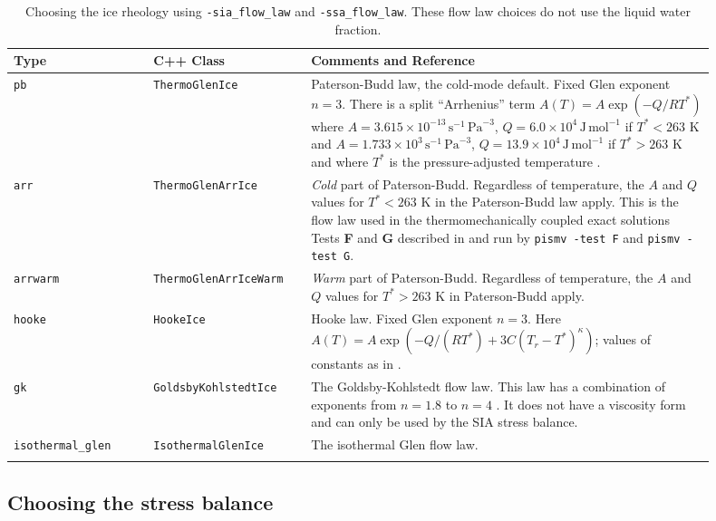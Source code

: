 \begin{table}[ht]
\centering
{}
\small
\begin{tabular}{p{0.18\linewidth}p{0.2\linewidth}p{0.52\linewidth}}\toprule
\textbf{Type} & C++ Class & \textbf{Comments and Reference} \\ \midrule
\texttt{pb} &\texttt{ThermoGlenIce}  & Paterson-Budd law, the cold-mode default.  Fixed Glen exponent $n=3$.  There is a split ``Arrhenius'' term $A(T) = A \exp(-Q/RT^*)$ where \mbox{$A = 3.615 \times 10^{-13}\, \text{s}^{-1}\, \text{Pa}^{-3}$}, \mbox{$Q = 6.0 \times 10^4\, \text{J}\, \text{mol}^{-1}$} if $T^* < 263$ K and
 \mbox{$A = 1.733 \times 10^{3}\, \text{s}^{-1}\, \text{Pa}^{-3}$}, \mbox{$Q = 13.9 \times 10^4\, \text{J}\, \text{mol}^{-1}$} if $T^* > 263$ K and where $T^*$ is the pressure-adjusted temperature \cite{PatersonBudd}. \\
\texttt{arr} &  \texttt{ThermoGlenArrIce} & \emph{Cold} part of Paterson-Budd.  Regardless of temperature, the $A$ and $Q$ values for $T^*<263$ K in  the Paterson-Budd law apply.  This is the flow law used in the thermomechanically coupled exact solutions Tests \textbf{F} and \textbf{G} described in \cite{BBL,BB} and run by \texttt{pismv -test F} and \texttt{pismv -test G}. \\
\texttt{arrwarm} & \texttt{ThermoGlenArrIceWarm} & \emph{Warm} part of Paterson-Budd.  Regardless of temperature, the $A$ and $Q$ values for $T^*>263$ K in Paterson-Budd apply.\\
\texttt{hooke} & \texttt{HookeIce} & Hooke law.  Fixed Glen exponent $n=3$.  Here  \mbox{$A(T) = A \exp(-Q/(RT^*) + 3C (T_r - T^*)^\kappa)$;} values of  constants as in \cite{Hooke,PayneBaldwin}.\\
\texttt{gk} & \texttt{GoldsbyKohlstedtIce} & The  Goldsby-Kohlstedt flow law.  This law has a combination of exponents  from $n=1.8$ to $n=4$ \cite{GoldsbyKohlstedt}. It does not have a viscosity form and can only be used by the SIA stress balance. \\
\texttt{isothermal_glen} &  \texttt{IsothermalGlenIce} &The isothermal Glen flow law. \\
\bottomrule
\normalsize	
\end{tabular}
\caption{Choosing the ice rheology using \texttt{-sia_flow_law} and \texttt{-ssa_flow_law}.  These flow law choices do not use the liquid water fraction.}
\label{tab:flowlaw}
\end{table}


\subsection{Choosing the stress balance}  \label{subsect:ssacontrol}

